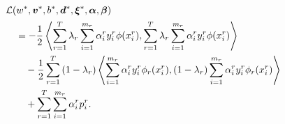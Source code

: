\begin{equation}\nonumber
    \begin{aligned}
        & \mathcal{L}({{w}}^*, {\bm{v}}^*, {b}^*, {\bm{d}}^*, {\bm{\xi}}^*, \bm{\alpha}, \bm{\beta})\\
        &\quad= - \frac{1}{2} \bm{\left\langle}  \sum_{r= 1}^T  \lambda_r \sum_{i=1}^{m_r} {\alpha_i^r}  y_i^r \phi({x}_i^r),  \sum_{r= 1}^T \lambda_r \sum_{i=1}^{m_r} {\alpha_i^r}  y_i^r \phi({x}_i^r) \bm{\right\rangle} \\
        &\qquad - \frac{1}{2} \sum_{r= 1}^T {(1-\lambda_r) \bm{\left\langle} \sum_{i=1}^{m_r} {\alpha_i^r}  y_i^r \phi_r({x}_i^r), (1-\lambda_r) \sum_{i=1}^{m_r} {\alpha_i^r}  y_i^r \phi_r({x}_i^r) \bm{\right\rangle}} \\
        &\qquad +  \sum_{r= 1}^T \sum_{i=1}^{m_r} \alpha_i^r  p_{i}^r .
    \end{aligned}
\end{equation}
